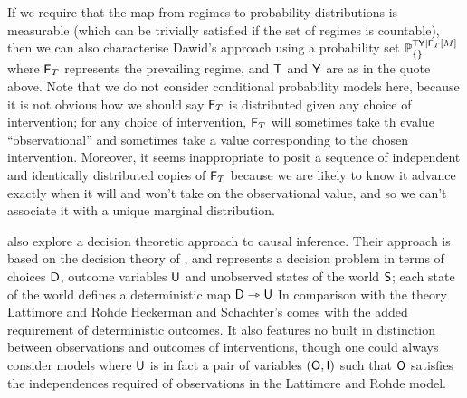 If we require that the map from regimes to probability distributions is measurable (which can be trivially satisfied if the set of regimes is countable), then we can also characterise Dawid's approach using a probability set $\mathbb{P}_{\{\}}^{\mathsf{TY}|\mathsf{F}_T[M]}$ where $\mathsf{F}_T$ represents the prevailing regime, and $\mathsf{T}$ and $\mathsf{Y}$ are as in the quote above. Note that we do not consider conditional probability models here, because it is not obvious how we should say $\mathsf{F}_T$ is distributed given any choice of intervention; for any choice of intervention, $\mathsf{F}_T$ will sometimes take th evalue ``observational'' and sometimes take a value corresponding to the chosen intervention. Moreover, it seems inappropriate to posit a sequence of independent and identically distributed copies of $\mathsf{F}_T$ because we are likely to know it advance exactly when it will and won't take on the observational value, and so we can't associate it with a unique marginal distribution.

\citet{heckerman_decision-theoretic_1995} also explore a decision theoretic approach to causal inference. Their approach is based on the decision theory of \citet{savage_foundations_1954}, and represents a decision problem in terms of choices $\mathsf{D}$, outcome variables $\mathsf{U}$ and unobserved states of the world $\mathsf{S}$; each state of the world defines a deterministic map $\mathsf{D}\rightarrowtriangle \mathsf{U}$ In comparison with the theory Lattimore and Rohde Heckerman and Schachter's comes with the added requirement of deterministic outcomes. It also features no built in distinction between observations and outcomes of interventions, though one could always consider models where $\mathsf{U}$ is in fact a pair of variables $(\mathsf{O},\mathsf{I})$ such that $\mathsf{O}$ satisfies the independences required of observations in the Lattimore and Rohde model.
